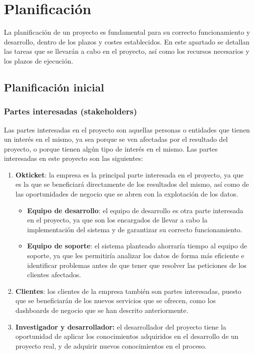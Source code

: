 \chapter{Planificación}\label{chap:planif}
La planificación de un proyecto es fundamental para su correcto funcionamiento y desarrollo,
dentro de los plazos y costes establecidos. En este apartado se detallan las tareas que se
llevarán a cabo en el proyecto, así como los recursos necesarios y los plazos de ejecución.

\section{Planificación inicial}\label{sec:planif}
\subsection{Partes interesadas (stakeholders)}\label{subsec:stakeholders}
Las partes interesadas en el proyecto son aquellas personas o entidades que tienen un interés
en el mismo, ya sea porque se ven afectadas por el resultado del proyecto, o porque tienen
algún tipo de interés en el mismo. Las partes interesadas en este proyecto son las siguientes:

\begin{enumerate}
	\item \textbf{Okticket}: la empresa es la principal parte interesada en el proyecto, ya que
		es la que se beneficiará directamente de los resultados del mismo, así como de las
		oportunidades de negocio que se abren con la explotación de los datos.
		\begin{itemize}
			\item \textbf{Equipo de desarrollo}: el equipo de desarrollo es otra parte interesada en el
				proyecto, ya que son los encargados de llevar a cabo la implementación del sistema y
				de garantizar su correcto funcionamiento.
			\item \textbf{Equipo de soporte}: el sistema planteado ahorraría tiempo al equipo de
				soporte, ya que les permitiría analizar los datos de forma más eficiente e identificar
				problemas antes de que tener que resolver las peticiones de los clientes afectados.
		\end{itemize}
	\item \textbf{Clientes}: los clientes de la empresa también son partes interesadas, puesto
		que se beneficiarán de los nuevos servicios que se ofrecen, como los dashboards de
		negocio que se han descrito anteriormente.
	\item \textbf{Investigador y desarrollador:} el desarrollador del proyecto tiene la oportunidad de
		aplicar los conocimientos adquiridos en el desarrollo de un proyecto real, y de adquirir
		nuevos conocimientos en el proceso.
\end{enumerate}

